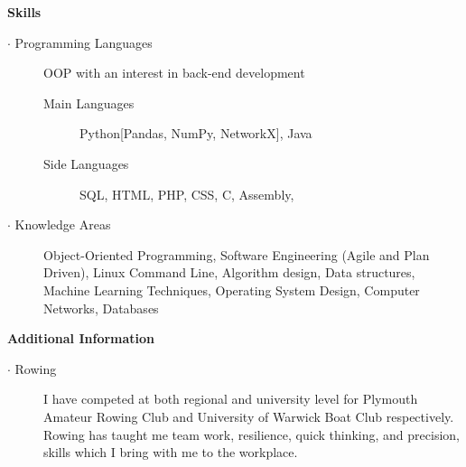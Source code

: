 \documentclass[12pt, a4paper]{article}
\begin{document}
\textbf{Skills}
  \begin{description}
    \item[$\cdot$ Programming Languages] OOP with an interest in back-end development
    \begin{description}
      \item[Main Languages] Python[Pandas, NumPy, NetworkX], Java
      \item[Side Languages] SQL, HTML, PHP, CSS, C, Assembly,
    \end{description}
    \item[$\cdot$ Knowledge Areas] Object-Oriented Programming, Software Engineering (Agile and Plan Driven), Linux Command Line, Algorithm design, Data structures, Machine Learning Techniques, Operating System Design, Computer Networks, Databases
  \end{description}
\bigskip

  \textbf{Additional Information}
    \begin{description}
      \item[$\cdot$ Rowing] I have competed at both regional and university level for Plymouth Amateur Rowing Club and University of Warwick Boat Club respectively. Rowing has taught me team work, resilience, quick thinking, and precision, skills which I bring with me to the workplace.

      \iffalse
      Time management $\cdot$ Team work $\cdot$ Resilience $\cdot$ Motivational skills $\cdot$ Quick thinking \\ $\cdot$ Technical planning $\cdot$ Precision
      \fi
    \end{description}
\end{document}
